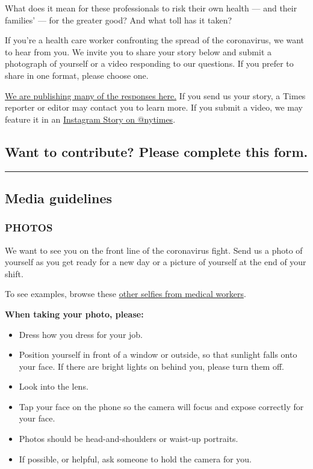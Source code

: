 What does it mean for these professionals to risk their own health ---
and their families' --- for the greater good? And what toll has it
taken?

If you're a health care worker confronting the spread of the
coronavirus, we want to hear from you. We invite you to share your story
below and submit a photograph of yourself or a video responding to our
questions. If you prefer to share in one format, please choose one.

\href{https://www.nytimes3xbfgragh.onion/interactive/2020/world/coronavirus-health-care-workers.html}{We
are publishing many of the responses here.} If you send us your story, a
Times reporter or editor may contact you to learn more. If you submit a
video, we may feature it in an
\href{https://www.instagram.com/nytimes/}{Instagram Story on @nytimes}.

\hypertarget{want-to-contribute-please-complete-this-form}{%
\subsection{Want to contribute? Please complete this
form.}\label{want-to-contribute-please-complete-this-form}}

\begin{center}\rule{0.5\linewidth}{\linethickness}\end{center}

\hypertarget{media-guidelines}{%
\subsection{Media guidelines}\label{media-guidelines}}

\hypertarget{photos}{%
\subsubsection{PHOTOS}\label{photos}}

We want to see you on the front line of the coronavirus fight. Send us a
photo of yourself as you get ready for a new day or a picture of
yourself at the end of your shift.

To see examples, browse these
\href{https://www.instagram.com/covid_nurses/}{other selfies from
medical workers}.

\textbf{When taking your photo, please:}

\begin{itemize}
\item
  Dress how you dress for your job.
\item
  Position yourself in front of a window or outside, so that sunlight
  falls onto your face. If there are bright lights on behind you, please
  turn them off.
\item
  Look into the lens.
\item
  Tap your face on the phone so the camera will focus and expose
  correctly for your face.
\item
  Photos should be head-and-shoulders or waist-up portraits.
\item
  If possible, or helpful, ask someone to hold the camera for you.
\end{itemize}

